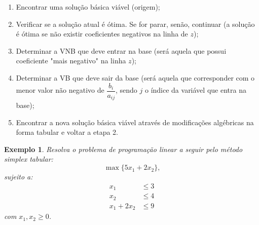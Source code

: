 \documentclass[
	12pt,				%
	openright,			%
	twoside,			%
	a4paper,			%
	english,			%
	french,				%
	brazil,				%
	sumario=tradicional
]{abntex2}
\newtheorem{example}{Exemplo}
\numberwithin{example}{chapter}
\numberwithin{remark}{chapter}
\numberwithin{definition}{chapter}
\numberwithin{figure}{chapter}
\begin{document}
\begin{enumerate}
	\item Encontrar uma solução básica viável (origem);
	
	\item Verificar se a solução atual é ótima. Se for parar, senão, continuar (a solução é ótima se não existir coeficientes negativos na linha de $z$);
	
	\item Determinar a VNB que deve entrar na base (será aquela que possui coeficiente "mais negativo" na linha $z$);
	
	\item Determinar a VB que deve sair da base (será aquela que corresponder com o menor valor não negativo de $\dfrac{b_i}{a_{ij}}$, sendo $j$ o índice da variável que entra na base);
	
	\item Encontrar a nova solução básica viável através de modificações algébricas na forma tabular e voltar a etapa 2.
\end{enumerate}

\begin{example}
    Resolva o problema de programação linear a seguir pelo método simplex tabular:
    $$\max\{5x_1+2x_2\}\text{,}$$
    sujeito a:
    \begin{align*}
        x_1  & \leqslant 3\\
        x_2  & \leqslant 4\\
        x_1 + 2x_2 & \leqslant 9
    \end{align*}
    com $x_1, x_2\geqslant 0$.
\end{example}
\end{document}

